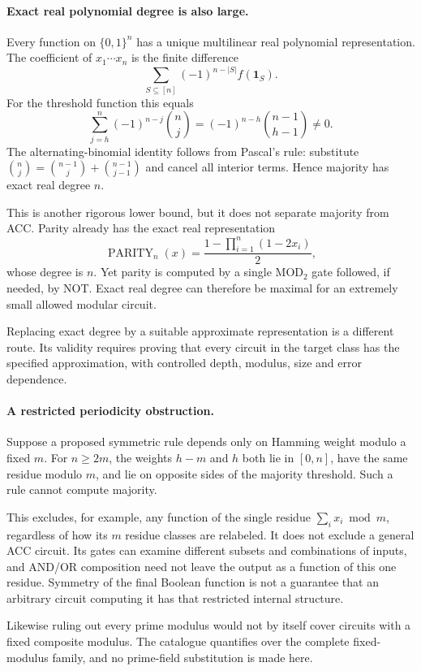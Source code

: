 \documentclass[11pt]{article}
\begin{document}
\paragraph{Exact real polynomial degree is also large.}
Every function on $\{0,1\}^n$ has a unique multilinear real polynomial representation. The coefficient of $x_1\cdots x_n$ is the finite difference
\[
 \sum_{S\subseteq[n]}(-1)^{n-|S|}f(\mathbf1_S).
\]
For the threshold function this equals
\[
 \sum_{j=h}^n(-1)^{n-j}\binom nj
       =(-1)^{n-h}\binom{n-1}{h-1}\ne0.
 \tag{266.2}
\]
The alternating-binomial identity follows from Pascal's rule: substitute
$\binom nj=\binom{n-1}j+\binom{n-1}{j-1}$ and cancel all interior terms. Hence majority has exact real degree $n$.

This is another rigorous lower bound, but it does not separate majority from ACC. Parity already has the exact real representation
\[
 \operatorname{PARITY}_n(x)
      =\frac{1-\prod_{i=1}^n(1-2x_i)}2,
\]
whose degree is $n$. Yet parity is computed by a single $\mathrm{MOD}_2$ gate followed, if needed, by NOT. Exact real degree can therefore be maximal for an extremely small allowed modular circuit.

Replacing exact degree by a suitable approximate representation is a different route. Its validity requires proving that every circuit in the target class has the specified approximation, with controlled depth, modulus, size and error dependence.

\paragraph{A restricted periodicity obstruction.}
Suppose a proposed symmetric rule depends only on Hamming weight modulo a fixed $m$. For $n\ge2m$, the weights $h-m$ and $h$ both lie in $[0,n]$, have the same residue modulo $m$, and lie on opposite sides of the majority threshold. Such a rule cannot compute majority.

This excludes, for example, any function of the single residue $\sum_i x_i\bmod m$, regardless of how its $m$ residue classes are relabeled. It does not exclude a general ACC circuit. Its gates can examine different subsets and combinations of inputs, and AND/OR composition need not leave the output as a function of this one residue. Symmetry of the final Boolean function is not a guarantee that an arbitrary circuit computing it has that restricted internal structure.

Likewise ruling out every prime modulus would not by itself cover circuits with a fixed composite modulus. The catalogue quantifies over the complete fixed-modulus family, and no prime-field substitution is made here.
\end{document}
